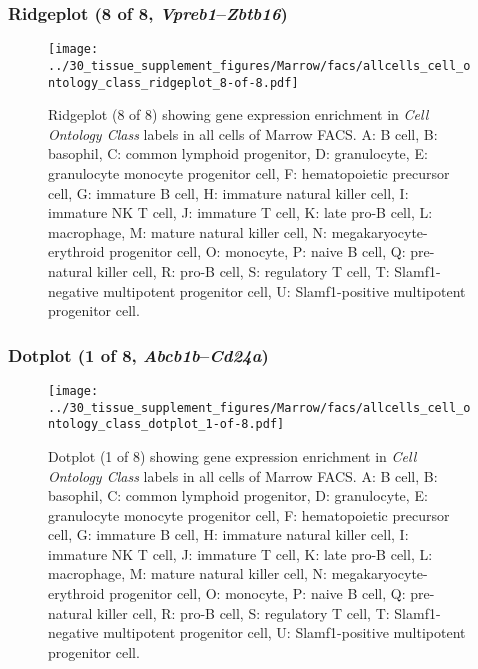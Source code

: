 \subsubsection{Ridgeplot (8 of 8, \emph{Vpreb1}--\emph{Zbtb16})}
\begin{figure}[h]
\centering
\texttt{[image: ../30\_tissue\_supplement\_figures/Marrow/facs/allcells\_cell\_ontology\_class\_ridgeplot\_8-of-8.pdf]}

\caption{ Ridgeplot (8 of 8)  showing gene expression enrichment in \emph{Cell Ontology Class} labels in all cells of Marrow FACS. A: B cell, B: basophil, C: common lymphoid progenitor, D: granulocyte, E: granulocyte monocyte progenitor cell, F: hematopoietic precursor cell, G: immature B cell, H: immature natural killer cell, I: immature NK T cell, J: immature T cell, K: late pro-B cell, L: macrophage, M: mature natural killer cell, N: megakaryocyte-erythroid progenitor cell, O: monocyte, P: naive B cell, Q: pre-natural killer cell, R: pro-B cell, S: regulatory T cell, T: Slamf1-negative multipotent progenitor cell, U: Slamf1-positive multipotent progenitor cell.}
\end{figure}


\clearpage

\subsubsection{Dotplot (1 of 8, \emph{Abcb1b}--\emph{Cd24a})}
\begin{figure}[h]
\centering
\texttt{[image: ../30\_tissue\_supplement\_figures/Marrow/facs/allcells\_cell\_ontology\_class\_dotplot\_1-of-8.pdf]}

\caption{ Dotplot (1 of 8)  showing gene expression enrichment in \emph{Cell Ontology Class} labels in all cells of Marrow FACS. A: B cell, B: basophil, C: common lymphoid progenitor, D: granulocyte, E: granulocyte monocyte progenitor cell, F: hematopoietic precursor cell, G: immature B cell, H: immature natural killer cell, I: immature NK T cell, J: immature T cell, K: late pro-B cell, L: macrophage, M: mature natural killer cell, N: megakaryocyte-erythroid progenitor cell, O: monocyte, P: naive B cell, Q: pre-natural killer cell, R: pro-B cell, S: regulatory T cell, T: Slamf1-negative multipotent progenitor cell, U: Slamf1-positive multipotent progenitor cell.}
\end{figure}


\clearpage

